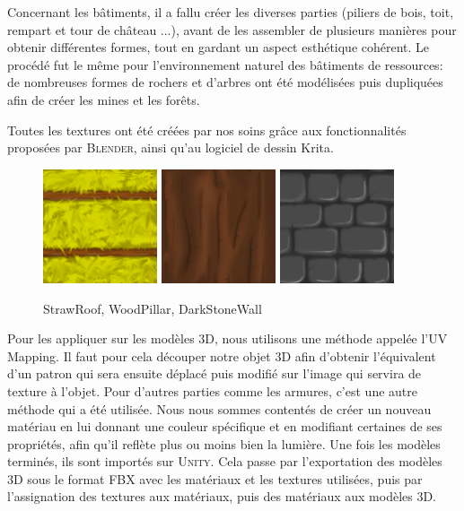 \documentclass[12pt]{report}
\begin{document}
Concernant les bâtiments, il a fallu créer les diverses parties (piliers de
bois, toit, rempart et tour de château ...), avant de les assembler de plusieurs
manières pour obtenir différentes formes, tout en gardant un aspect esthétique
cohérent. Le procédé fut le même pour l’environnement naturel des bâtiments de
ressources: de nombreuses formes de rochers et d’arbres ont été modélisées puis
dupliquées afin de créer les mines et les forêts.

Toutes les textures ont été créées par nos soins grâce aux fonctionnalités
proposées par \textsc{Blender}, ainsi qu’au logiciel de dessin Krita. 

\begin{figure}[H]
    \centering
    \includegraphics[width=0.3\textwidth]{../report_1/img/straw_roof}
    \includegraphics[width=0.3\textwidth]{../report_1/img/wood}
    \includegraphics[width=0.3\textwidth]{../report_2/img/DarkStoneWall}
    \caption*{StrawRoof, WoodPillar, DarkStoneWall}
\end{figure}

Pour les appliquer sur les modèles 3D, nous utilisons une méthode appelée l’UV
Mapping. Il faut pour cela découper notre objet 3D afin d’obtenir l’équivalent
d’un patron qui sera ensuite déplacé puis modifié sur l’image qui servira de
texture à l’objet. Pour d’autres parties comme les armures, c’est une autre
méthode qui a été utilisée. Nous nous sommes contentés de créer un nouveau
matériau en lui donnant une couleur spécifique et en modifiant certaines de ses
propriétés, afin qu’il reflète plus ou moins bien la lumière. Une fois les
modèles terminés, ils sont importés sur \textsc{Unity}. Cela passe par
l’exportation des modèles 3D sous le format FBX avec les matériaux et les
textures utilisées, puis par l’assignation des textures aux matériaux, puis des
matériaux aux modèles 3D.
\end{document}
